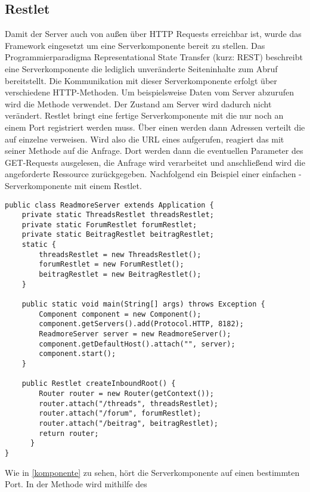 \subsection{Restlet}
Damit der Server auch von außen über HTTP Requests erreichbar ist, wurde das
Framework  eingesetzt um eine 
Serverkomponente bereit zu stellen. Das Programmierparadigma Representational
State Transfer (kurz: REST) beschreibt eine Serverkomponente die lediglich
unveränderte Seiteninhalte zum Abruf bereitstellt. Die Kommunikation mit dieser
Serverkomponente erfolgt über verschiedene HTTP-Methoden. Um beispielsweise
Daten vom Server abzurufen wird die Methode  verwendet. Der Zustand am Server
wird dadurch nicht verändert. Restlet bringt eine fertige Serverkomponente mit
die nur noch an einem Port registriert werden muss. Über einen
 werden dann Adressen verteilt die auf einzelne
 verweisen. Wird also die URL eines 
aufgerufen, reagiert das  mit seiner Methode
 auf die Anfrage. Dort werden dann die eventuellen Parameter des
GET-Requests ausgelesen, die Anfrage wird verarbeitet und anschließend wird die
angeforderte Ressource zurückgegeben. Nachfolgend ein Beispiel einer einfachen
-Serverkomponente mit einem Restlet.
\begin{lstlisting}[caption=Die Serverkomponente, label=komponente]
public class ReadmoreServer extends Application {
	private static ThreadsRestlet threadsRestlet;
	private static ForumRestlet forumRestlet;
	private static BeitragRestlet beitragRestlet;
	static {
		threadsRestlet = new ThreadsRestlet();
		forumRestlet = new ForumRestlet();
		beitragRestlet = new BeitragRestlet();
	}
	
	public static void main(String[] args) throws Exception {
		Component component = new Component();
		component.getServers().add(Protocol.HTTP, 8182);
		ReadmoreServer server = new ReadmoreServer();
		component.getDefaultHost().attach("", server);
		component.start();
	}
	
	public Restlet createInboundRoot() {
	    Router router = new Router(getContext());
	    router.attach("/threads", threadsRestlet);
	    router.attach("/forum", forumRestlet);
	    router.attach("/beitrag", beitragRestlet);
	    return router;
	  }
}
\end{lstlisting}
Wie in \ref{komponente} zu sehen, hört die Serverkomponente auf einen bestimmten
Port. In der Methode  wird mithilfe des 
